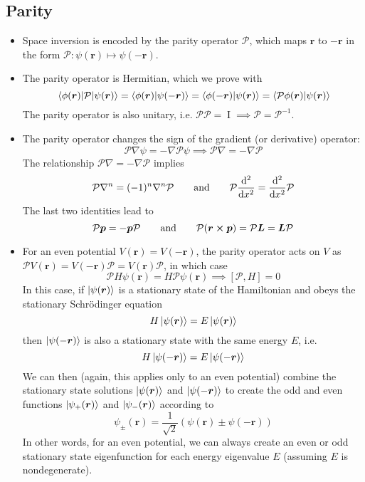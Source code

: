 \documentclass[11pt, a4paper]{article}
\renewcommand{\grad}{\nabla}
\newcommand{\eqtext}[1]{\qquad \text{#1} \qquad}
\newcommand{\Schro}{Schr\"{o}dinger\xspace}
\newcommand{\Ham}{Hamiltonian\xspace}
\newcommand{\Herm}{Hermitian\xspace}
\renewcommand{\vec}[1]{\bm{#1}}  %
\renewcommand{\r}{\vec{r}}  %
\newcommand{\II}{\operatorname{I}}  %
\newcommand{\Par}{\mathcal{P}}  %
\newcommand{\p}{\psi}  %
\renewcommand{\k}[1]{\ket{#1}}
\begin{document}
\subsection{Parity}
\begin{itemize}
	\item Space inversion is encoded by the parity operator $ \Par $, which maps $ \r $ to $ -\r $ in the form $ \Par:\p(\r) \mapsto \p(-\r) $.
	
	\item The parity operator is \Herm, which we prove with
	\begin{equation*}
		\mel{\phi(\r)}{\Par}{\p(\r)} = \braket{\phi(\r)}{\p(-\r)} = \braket{\phi(-\r)}{\p(\r)} = \braket{\Par \phi(\r)}{\p(\r)}
	\end{equation*}
	The parity operator is also unitary, i.e. $ \Par \Par = \II \implies \Par = \Par^{-1} $.

	\item The parity operator changes the sign of the gradient (or derivative) operator:
	\begin{equation*}
		\Par \grad \p = - \grad \Par \psi \implies \Par \grad = - \grad \Par
	\end{equation*}
	The relationship $ \Par \grad = - \grad \Par $ implies
	\begin{equation*}
		\Par \grad^{n} = (-1)^{n}\grad^{n} \Par \eqtext{and} \Par \dv[2]{}{x} = \dv[2]{}{x} \Par
	\end{equation*}
	The last two identities lead to
	\begin{equation*}
		\Par \vec{p} = - \vec{p} \Par \eqtext{and} \Par (\r \cross \vec{p}) = \Par \vec{L} = \vec{L} \Par 
	\end{equation*}
	
	\item For an even potential $ V(\r) = V(-\r) $, the parity operator acts on $ V $ as $ \Par V(\r) = V(-\r)\Par = V(\r)\Par $, in which case
	\begin{equation*}
		\Par H\p(\r) = H \Par \p(\r) \implies [\Par, H] = 0
	\end{equation*}
	In this case, if $ \ket{\p(\r)} $ is a stationary state of the \Ham and obeys the stationary \Schro equation
	\begin{equation*}
		H\k{\p(\r)} = E \ket{\p(\r)}
	\end{equation*}
	then $ \ket{\p(-\r)} $ is also a stationary state with the same energy $ E $, i.e.
	\begin{equation*}
		H\k{\p(-\r)} = E \ket{\p(-\r)}
	\end{equation*}
	We can then (again, this applies only to an even potential) combine the stationary state solutions $  \ket{\p(\r)} $ and $ \ket{\p(-\r)} $ to create the odd and even functions $  \ket{\p_{+}(\r)} $ and $ \k{\p_{-}(\r)} $ according to
	\begin{equation*}
		\p_{\pm}(\r) = \frac{1}{\sqrt{2}}\left(\p(\r) \pm \p(-\r)\right)
	\end{equation*}
	In other words, for an even potential, we can always create an even or odd stationary state eigenfunction for each energy eigenvalue $ E $ (assuming $ E $ is nondegenerate).
	

\end{itemize}
\end{document}
